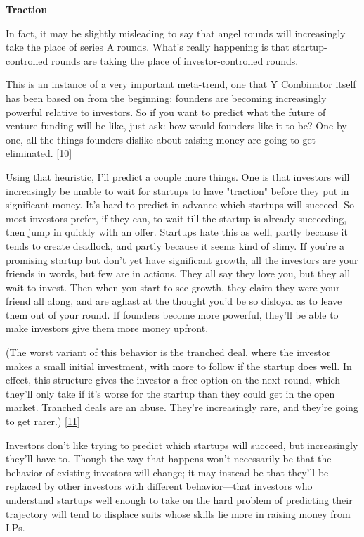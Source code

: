 \textbf{Traction}

In fact, it may be slightly misleading to say that angel rounds
will increasingly take the place of series A rounds.  What's really
happening is that startup-controlled rounds are taking the place
of investor-controlled rounds.

This is an instance of a very important meta-trend, one that Y
Combinator itself has been based on from the beginning: founders
are becoming increasingly powerful relative to investors.  So if
you want to predict what the future of venture funding will be like,
just ask: how would founders like it to be?  One by one, all the
things founders dislike about raising money are going to get
eliminated. 
[\href{\#f10n}{10}]

Using that heuristic, I'll predict a couple more things.  One is
that investors will increasingly be unable to wait for startups to
have "traction" before they put in significant money.  It's hard
to predict in advance which startups will succeed.  So most investors
prefer, if they can, to wait till the startup is already succeeding,
then jump in quickly with an offer.  Startups hate this as well,
partly because it tends to create deadlock, and partly because it
seems kind of slimy.  If you're a promising startup but don't yet
have significant growth, all the investors are your friends in
words, but few are in actions.  They all say they love you, but
they all wait to invest. Then when you start to see growth, they
claim they were your friend all along, and are aghast at the thought
you'd be so disloyal as to leave them out of your round.  If founders
become more powerful, they'll be able to make investors give them
more money upfront.

(The worst variant of this behavior is the tranched deal, where the
investor makes a small initial investment, with more to follow if
the startup does well.  In effect, this structure gives the investor
a free option on the next round, which they'll only take if it's
worse for the startup than they could get in the open market.
Tranched deals are an abuse.  They're increasingly rare, and they're
going to get rarer.) 
[\href{\#f11n}{11}]

Investors don't like trying to predict which startups will succeed,
but increasingly they'll have to.  Though the way that happens won't
necessarily be that the behavior of existing investors will change;
it may instead be that they'll be replaced by other investors with
different behavior---that investors who understand startups
well enough to take on the hard problem of predicting their trajectory
will tend to displace suits whose skills lie more in raising money
from LPs.

